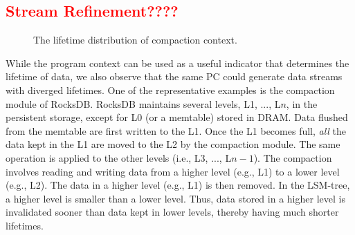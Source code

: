 \subsection{\textcolor{red}{Stream Refinement????}}
\begin{figure}[!t]
\centering
\hspace{1pt}
\hfill
\vspace{-10pt}
\vspace{-10pt}
\caption{The lifetime distribution of compaction context.} 
\label{fig:compaction}
\vspace{-15pt}
\end{figure}

While the program context can be used as a useful indicator that determines the
lifetime of data, we also observe that the same PC could generate data streams
with diverged lifetimes. One of the representative examples is the compaction
module of RocksDB. RocksDB maintains several levels, L1, ..., L$n$, in the
persistent storage, except for L0 (or a memtable) stored in DRAM.  Data flushed
from the memtable are first written to the L1.  Once the L1 becomes full,
\textit{all} the data kept in the L1 are moved to the L2 by the compaction
module.  The same operation is applied to the other levels (i.e., L3, ...,
L$n-1$).  The compaction involves reading and writing data from a higher level
(e.g., L1) to a lower level (e.g., L2).  The data in a higher level (e.g., L1)
is then removed.  In the LSM-tree, a higher level is smaller than a lower
level. Thus, data stored in a higher level is invalidated sooner than data kept
in lower levels, thereby having much shorter lifetimes.


